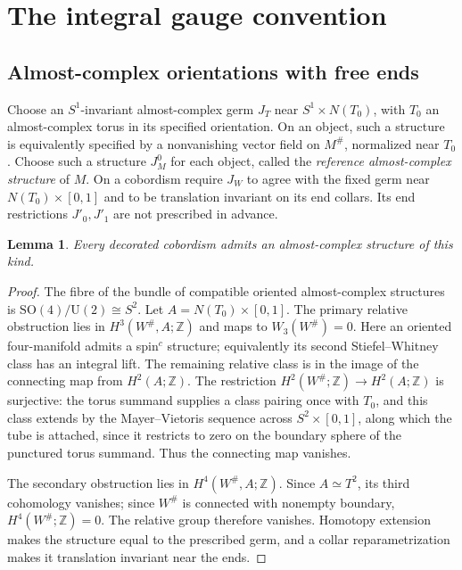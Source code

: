 \documentclass[11pt]{amsart}
\newtheorem{lemma}[theorem]{Lemma}
\theoremstyle{definition}
\theoremstyle{remark}
\theoremstyle{plain}
\numberwithin{equation}{section}
\newcommand{\ZZ}{\mathbb Z}
\newcommand{\SO}{\mathrm{SO}}
\newcommand{\U}{\mathrm U}
\begin{document}
\section{The integral gauge convention}\label{sec:gauge}

\subsection{Almost-complex orientations with free ends}
Choose an $S^1$-invariant almost-complex germ $J_T$ near
$S^1\times N(T_0)$, with $T_0$ an almost-complex torus in its
specified orientation. On an object, such a structure is equivalently
specified by a nonvanishing vector field on $M^\#$, normalized near
$T_0$. Choose such a structure $J^0_M$ for each object, called the
\emph{reference almost-complex structure} of $M$. On a cobordism require
$J_W$ to agree with the fixed germ near $N(T_0)\times[0,1]$ and to be
translation invariant on its end collars. Its end restrictions
$J'_0,J'_1$ are not prescribed in advance.

\begin{lemma}\label{lem:almost-complex}
Every decorated cobordism admits an almost-complex structure of
this kind.
\end{lemma}
\begin{proof}
The fibre of the bundle of compatible oriented almost-complex
structures is $\SO(4)/\U(2)\cong S^2$. Let
$A=N(T_0)\times[0,1]$. The primary relative obstruction lies in
$H^3(W^\#,A;\ZZ)$ and maps to $W_3(W^\#)=0$. Here an oriented
four-manifold admits a spin$^c$ structure; equivalently its second
Stiefel--Whitney class has an integral lift. The remaining relative
class is in the image of the connecting map from $H^2(A;\ZZ)$.
The restriction $H^2(W^\#;\ZZ)\to H^2(A;\ZZ)$ is surjective:
the torus summand supplies a class pairing once with $T_0$, and
this class extends by the Mayer--Vietoris sequence across
$S^2\times[0,1]$, along which the tube is attached, since it
restricts to zero on the boundary sphere of the punctured torus
summand. Thus the connecting map vanishes.

The secondary obstruction lies in $H^4(W^\#,A;\ZZ)$.
Since $A\simeq T^2$, its third cohomology vanishes; since
$W^\#$ is connected with nonempty boundary, $H^4(W^\#;\ZZ)=0$.
The relative group therefore vanishes. Homotopy extension makes
the structure equal to the prescribed germ, and a collar
reparametrization makes it translation invariant near the ends.
\end{proof}
\end{document}
